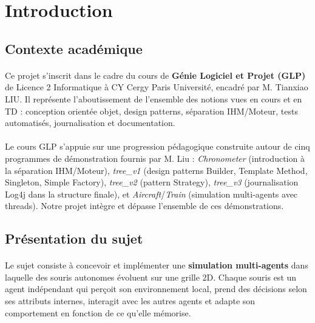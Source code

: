 \section{Introduction}

\subsection{Contexte académique}

\paragraph{} Ce projet s'inscrit dans le cadre du cours de \textbf{Génie Logiciel et Projet (GLP)} de Licence 2 Informatique à CY Cergy Paris Université, encadré par M. Tianxiao LIU. Il représente l'aboutissement de l'ensemble des notions vues en cours et en TD : conception orientée objet, design patterns, séparation IHM/Moteur, tests automatisés, journalisation et documentation.

\paragraph{} Le cours GLP s'appuie sur une progression pédagogique construite autour de cinq programmes de démonstration fournis par M. Liu : \textit{Chronometer} (introduction à la séparation IHM/Moteur), \textit{tree\_v1} (design patterns Builder, Template Method, Singleton, Simple Factory), \textit{tree\_v2} (pattern Strategy), \textit{tree\_v3} (journalisation Log4j dans la structure finale), et \textit{Aircraft}/\textit{Train} (simulation multi-agents avec threads). Notre projet intègre et dépasse l'ensemble de ces démonstrations.

\subsection{Présentation du sujet}

\paragraph{} Le sujet consiste à concevoir et implémenter une \textbf{simulation multi-agents} dans laquelle des souris autonomes évoluent sur une grille 2D. Chaque souris est un agent indépendant qui perçoit son environnement local, prend des décisions selon ses attributs internes, interagit avec les autres agents et adapte son comportement en fonction de ce qu'elle mémorise.

